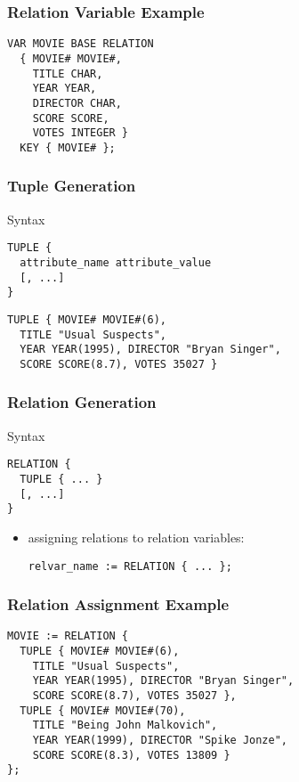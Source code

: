 \documentclass[dvipsnames]{beamer}
\theoremstyle{plain}
\begin{document}
\begin{frame}[fragile]
  \frametitle{Relation Variable Example}

  \begin{example}
    \begin{lstlisting}
VAR MOVIE BASE RELATION
  { MOVIE# MOVIE#,
    TITLE CHAR,
    YEAR YEAR,
    DIRECTOR CHAR,
    SCORE SCORE,
    VOTES INTEGER }
  KEY { MOVIE# };
    \end{lstlisting}
  \end{example}
\end{frame}

\begin{frame}[fragile]
  \frametitle{Tuple Generation}

  \begin{block}{Syntax}
    \begin{lstlisting}
TUPLE {
  attribute_name attribute_value
  [, ...]
}
    \end{lstlisting}
  \end{block}

  \pause
  \begin{example}
    \begin{lstlisting}
TUPLE { MOVIE# MOVIE#(6),
  TITLE "Usual Suspects",
  YEAR YEAR(1995), DIRECTOR "Bryan Singer",
  SCORE SCORE(8.7), VOTES 35027 }
    \end{lstlisting}
  \end{example}
\end{frame}

\begin{frame}[fragile]
  \frametitle{Relation Generation}

  \begin{block}{Syntax}
    \begin{lstlisting}
RELATION {
  TUPLE { ... }
  [, ...]
}
    \end{lstlisting}
  \end{block}

  \begin{itemize}
    \item assigning relations to relation variables:
    \begin{lstlisting}
relvar_name := RELATION { ... };
    \end{lstlisting}
  \end{itemize}
\end{frame}

\begin{frame}[fragile]
  \frametitle{Relation Assignment Example}

  \begin{example}
    \begin{lstlisting}
MOVIE := RELATION {
  TUPLE { MOVIE# MOVIE#(6),
    TITLE "Usual Suspects",
    YEAR YEAR(1995), DIRECTOR "Bryan Singer",
    SCORE SCORE(8.7), VOTES 35027 },
  TUPLE { MOVIE# MOVIE#(70),
    TITLE "Being John Malkovich",
    YEAR YEAR(1999), DIRECTOR "Spike Jonze",
    SCORE SCORE(8.3), VOTES 13809 }
};
    \end{lstlisting}
  \end{example}
\end{frame}
\end{document}
